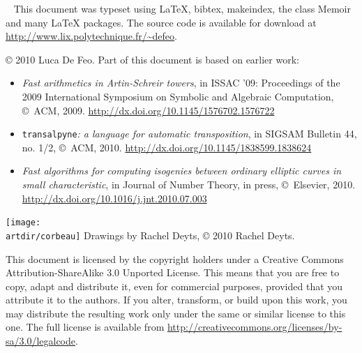 \begin{titlingpage}
  \setlength{\parindent}{0pt}
  
  \begin{center}
    \scshape\huge\thetitle
  \end{center}

  \clearpage

  ~\vfill
  \footnotesize
  This document was typeset using \LaTeX{}, bibtex, makeindex, the
  class Memoir and many \LaTeX{} packages. The source code is
  available for download at
  \url{http://www.lix.polytechnique.fr/~defeo}.

  \bigskip

  \copyright{} 2010 Luca De Feo.  Part of this document is based on
  earlier work:
  \begin{itemize}
  \item \textit{Fast arithmetics in Artin-Schreir towers}, in ISSAC
    '09: Proceedings of the 2009 International Symposium on Symbolic
    and Algebraic Computation, \copyright{}~ACM,
    2009. \url{http://dx.doi.org/10.1145/1576702.1576722}
  \item \texttt{transalpyne}\textit{: a language for automatic
      transposition}, in SIGSAM Bulletin 44, no. 1/2,
    \copyright{}~ACM,
    2010. \url{http://dx.doi.org/10.1145/1838599.1838624}
  \item \textit{Fast algorithms for computing isogenies between
      ordinary elliptic curves in small characteristic}, in Journal of
    Number Theory, in press, \copyright{}~Elsevier,
    2010. \url{http://dx.doi.org/10.1016/j.jnt.2010.07.003}
  \end{itemize}

  \bigskip

  \ifartwork 
  \texttt{[image: \\artdir/corbeau]}
  Drawings by Rachel Deyts, \copyright{} 2010 Rachel Deyts.
  \bigskip\fi

  \href{http://creativecommons.org/licenses/by-sa/3.0}{}
  This document is licensed by the copyright holder\ifartwork s\fi{}
  under a Creative Commons Attribution-ShareAlike 3.0 Unported
  License. This means that you are free to copy, adapt and distribute
  it, even for commercial purposes, provided that you attribute it to
  the author\ifartwork s\fi.  If you alter, transform, or build upon
  this work, you may distribute the resulting work only under the same
  or similar license to this one.  The full license is available from
  \url{http://creativecommons.org/licenses/by-sa/3.0/legalcode}.
\end{titlingpage}

